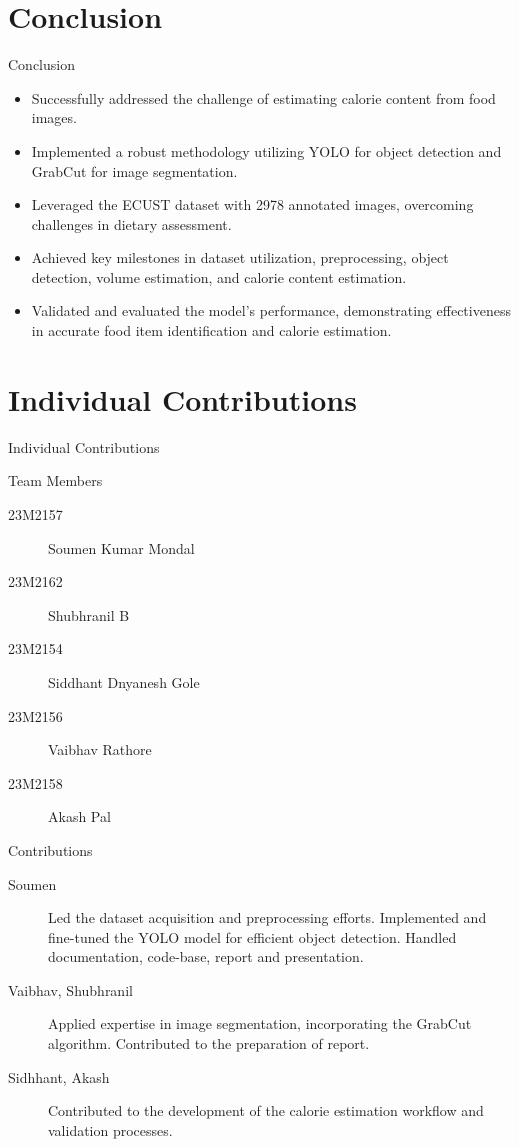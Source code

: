 \documentclass{beamer}
\begin{document}
	\section{Conclusion}
	\begin{frame}{Conclusion}
		\begin{block}{}
			\begin{itemize}
				\item Successfully addressed the challenge of estimating calorie content from food images.
				\item Implemented a robust methodology utilizing YOLO for object detection and GrabCut for image segmentation.
				\item Leveraged the ECUST dataset with 2978 annotated images, overcoming challenges in dietary assessment.\pause
				\item Achieved key milestones in dataset utilization, preprocessing, object detection, volume estimation, and calorie content estimation.
				\item Validated and evaluated the model's performance, demonstrating effectiveness in accurate food item identification and calorie estimation.
			\end{itemize}
		\end{block}
	\end{frame}
	
	\section{Individual Contributions}
	\begin{frame}{Individual Contributions}
		\begin{block}{Team Members}\scriptsize
			\begin{description}
				\item [23M2157] Soumen Kumar Mondal
				\item [23M2162] Shubhranil B
				\item [23M2154] Siddhant Dnyanesh Gole
				\item [23M2156] Vaibhav Rathore
				\item [23M2158] Akash Pal
			\end{description}
		\end{block}
		\begin{block}{Contributions}\scriptsize
			\begin{description}
				\item [Soumen] Led the dataset acquisition and preprocessing efforts. Implemented and fine-tuned the YOLO model for efficient object detection. Handled documentation, code-base, report and presentation.
				\item [Vaibhav, Shubhranil] Applied expertise in image segmentation, incorporating the GrabCut algorithm. Contributed to the preparation of report.
				\item [Sidhhant, Akash] Contributed to the development of the calorie estimation workflow and validation processes. 
			\end{description}
		\end{block}
	\end{frame}
	
\end{document}
